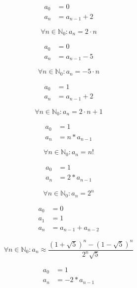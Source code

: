 \documentclass[12pt,a4paper]{article}
\begin{document}
\pagestyle{empty}
\noindent

\begin{multicols}{2}

\begin{align*}
a_0 &= 0 \\
a_n &= a_{n-1} + 2
\end{align*}

\[
\forall n \in \mathbb{N}_0: a_n = 2 \cdot n
\]


\begin{align*}
a_0 &= 0 \\
a_n &= a_{n-1} - 5
\end{align*}

\[
\forall n \in \mathbb{N}_0: a_n = -5 \cdot n
\]


\begin{align*}
a_0 &= 1 \\
a_n &= a_{n-1} + 2
\end{align*}

\[
\forall n \in \mathbb{N}_0: a_n = 2 \cdot n + 1
\]


\begin{align*}
a_0 &= 1 \\
a_n &= n * a_{n-1}
\end{align*}

\[
\forall n \in \mathbb{N}_0: a_n = n!
\]


\begin{align*}
a_0 &= 1 \\
a_n &= 2 * a_{n-1}
\end{align*}

\[
\forall n \in \mathbb{N}_0: a_n = 2^n
\]


\begin{align*}
a_0 &= 0 \\
a_1 &= 1 \\
a_n &= a_{n-1} + a_{n-2}
\end{align*}

\[
\forall n \in \mathbb{N}_0: a_n \approx \frac{\left(1+\sqrt{5}\right)^n - \left(1-\sqrt{5}\right)^n}{2^n \sqrt{5}}
\]


\begin{align*}
a_0 &= 1 \\
a_n &= -2 * a_{n-1}
\end{align*}


\end{multicols}
\end{document}
